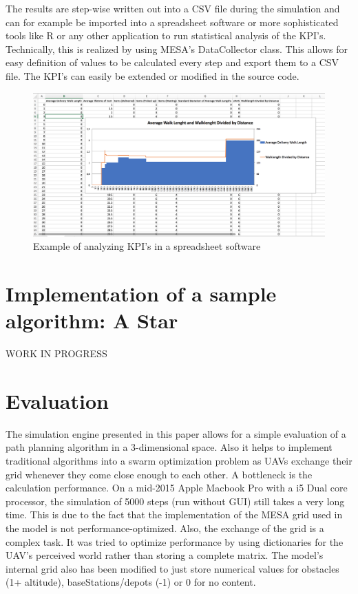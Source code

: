 The results are step-wise written out into a CSV file during the simulation and can for example be imported into a spreadsheet software or more sophisticated tools like R or any other application to run statistical analysis of the KPI's. Technically, this is realized by using MESA's DataCollector class. This allows for easy definition of values to be calculated every step and export them to a CSV file. The KPI's can easily be extended or modified in the source code.

\begin{figure}[htbp]
	\centering
	\includegraphics[scale=0.4]{images/walk}
	\caption{Example of analyzing KPI's in a spreadsheet software}
\end{figure}



\section{Implementation of a sample algorithm: A Star}\label{sec:algorithm}
WORK IN PROGRESS


\section{Evaluation}
The simulation engine presented in this paper allows for a simple evaluation of a path planning algorithm in a 3-dimensional space. Also it helps to implement traditional algorithms into a swarm optimization problem as UAVs exchange their grid whenever they come close enough to each other. A bottleneck is the calculation performance. On a mid-2015 Apple Macbook Pro with a i5 Dual core processor, the simulation of 5000 steps (run without GUI) still takes a very long time. This is due to the fact that the implementation of the MESA grid used in the model is not performance-optimized. Also, the exchange of the grid is a complex task. It was tried to optimize performance by using dictionaries for the UAV's perceived world rather than storing a complete matrix. The model's internal grid also has been modified to just store numerical values for obstacles (1+ altitude), baseStations/depots (-1) or 0 for no content.

